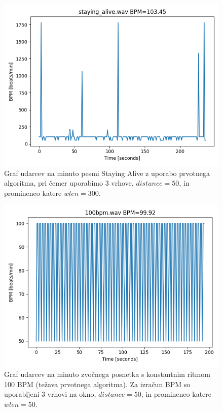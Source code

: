 \documentclass[a4paper,11pt]{article}
\begin{document}
\begin{figure}[htbp]
\begin{center}
\includegraphics[scale=0.5]{images/sa_bpm_p3_orig.png}
\caption{Graf udarcev na minuto pesmi Staying Alive z uporabo prvotnega algoritma, pri čemer uporabimo 3 vrhove, $distance = 50$, in prominenco katere $wlen = 300$.}
\label{bpm_sa1}
\end{center}
\end{figure}

\begin{figure}[htbp]
\begin{center}
\includegraphics[scale=0.5]{images/100_bpm_orig_wlen50.png}
\caption{Graf udarcev na minuto zvočnega posnetka s konstantnim ritmom 100 BPM (težava prvotnega algoritma). Za izračun BPM so uporabljeni 3 vrhovi na okno, $distance = 50$, in prominenco katere $wlen = 50$.}
\label{bpm_100}
\end{center}
\end{figure}
\end{document}
